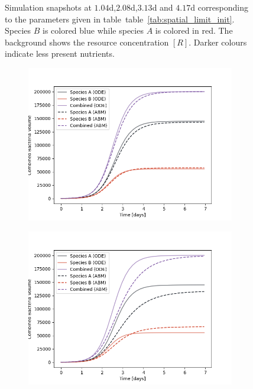\documentclass[10pt,A4paper]{article}
\numberwithin{equation}{section}
\begin{document}
\begin{figure}
    \caption{
        Simulation snapshots at $1.04$\unit{\day},$2.08$\unit{\day},$3.13$\unit{\day} and $4.17$\unit{\day} corresponding to the parameters given in table~table~\ref{tab:spatial_limit_init}.
        Species $B$ is colored blue while species $A$ is colored in red.
        The background shows the resource concentration $[R]$.
        Darker colours indicate less present nutrients.
    }
    \label{fig:spatial-snapshots}
\end{figure}
%
%
\begin{figure}
    \centering
    \begin{subfigure}[c]{0.5\columnwidth}
        \includegraphics[width=0.9\columnwidth]{Figures/abm-homogenous/abm_ode_comparison.png}
    \end{subfigure}%
    \begin{subfigure}[c]{0.5\columnwidth}
        \includegraphics[width=0.9\columnwidth]{Figures/abm-homogenous-low-diffusion/abm_ode_comparison.png}

\end{subfigure}
\end{figure}
\end{document}
